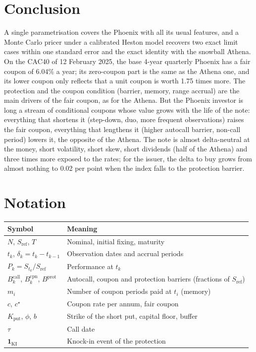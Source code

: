 \documentclass[11pt,a4paper]{article}
\newcommand{\ind}{\mathbf{1}}
\newcommand{\Sref}{S_{\mathrm{ref}}}
\begin{document}
\section{Conclusion}
A single parametrisation covers the Phoenix with all its usual features, and a Monte Carlo pricer under a calibrated
Heston model recovers two exact limit cases within one standard error and the exact identity with the snowball
Athena. On the CAC40 of 12 February 2025, the base 4-year quarterly Phoenix has a fair coupon of 6.04\% a year; its
zero-coupon part is the same as the Athena one, and its lower coupon only reflects that a unit coupon is worth 1.75
times more. The protection and the coupon condition (barrier, memory, range accrual) are the main drivers of the fair
coupon, as for the Athena. But the Phoenix investor is long a stream of conditional coupons whose value grows with
the life of the note: everything that shortens it (step-down, duo, more frequent observations) raises the fair
coupon, everything that lengthens it (higher autocall barrier, non-call period) lowers it, the opposite of the Athena.
The note is almost delta-neutral at the money, short volatility, short skew, short dividends (half of the Athena)
and three times more exposed to the rates; for the issuer, the delta to buy grows from almost nothing to 0.02 per
point when the index falls to the protection barrier.

\appendix
\section{Notation}
\begin{center}
\begin{tabular}{@{}ll@{}}
\toprule
Symbol & Meaning \\
\midrule
$N$, $\Sref$, $T$ & Nominal, initial fixing, maturity \\
$t_k$, $\delta_k = t_k - t_{k-1}$ & Observation dates and accrual periods \\
$P_k = S_{t_k}/\Sref$ & Performance at $t_k$ \\
$B^{\mathrm{call}}_k$, $B^{\mathrm{cpn}}_k$, $B^{\mathrm{prot}}$ & Autocall, coupon and protection barriers (fractions of $\Sref$) \\
$m_i$ & Number of coupon periods paid at $t_i$ (memory) \\
$c$, $c^\star$ & Coupon rate per annum, fair coupon \\
$K_{\mathrm{put}}$, $\phi$, $b$ & Strike of the short put, capital floor, buffer \\
$\tau$ & Call date \\
$\ind_{\mathrm{KI}}$ & Knock-in event of the protection \\
\bottomrule
\end{tabular}
\end{center}
\end{document}
